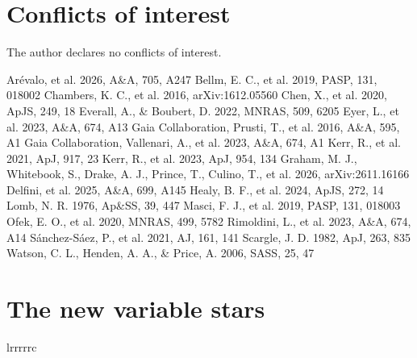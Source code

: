 \documentclass[twocolumn]{searchchev_preprint}
\begin{document}
\section*{Conflicts of interest}
The author declares no conflicts of interest.

\begin{thebibliography}{}
 Ar\'evalo, et al. 2026, A\&A, 705, A247
 Bellm, E. C., et al. 2019, PASP, 131, 018002
 Chambers, K. C., et al. 2016, arXiv:1612.05560
 Chen, X., et al. 2020, ApJS, 249, 18
 Everall, A., \& Boubert, D. 2022, MNRAS, 509, 6205
 Eyer, L., et al. 2023, A\&A, 674, A13
 Gaia Collaboration, Prusti, T., et al. 2016, A\&A, 595, A1
 Gaia Collaboration, Vallenari, A., et al. 2023, A\&A, 674, A1
 Kerr, R., et al. 2021, ApJ, 917, 23
 Kerr, R., et al. 2023, ApJ, 954, 134
 Graham, M. J., Whitebook, S., Drake, A. J., Prince, T., Culino, T., et al. 2026, arXiv:2611.16166
 Delfini, et al. 2025, A\&A, 699, A145
 Healy, B. F., et al. 2024, ApJS, 272, 14
 Lomb, N. R. 1976, Ap\&SS, 39, 447
 Masci, F. J., et al. 2019, PASP, 131, 018003
 Ofek, E. O., et al. 2020, MNRAS, 499, 5782
 Rimoldini, L., et al. 2023, A\&A, 674, A14
 S\'anchez-S\'aez, P., et al. 2021, AJ, 161, 141
 Scargle, J. D. 1982, ApJ, 263, 835
 Watson, C. L., Henden, A. A., \& Price, A. 2006, SASS, 25, 47
\end{thebibliography}

\appendix
\section{The new variable stars}
\startlongtable
\begin{deluxetable*}{lrrrrrc}
\startdata

\enddata
\end{deluxetable*}
\end{document}
